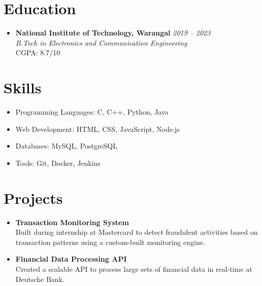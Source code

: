 \documentclass[a4paper,10pt]{article} %
\begin{document}
\vspace{0.7em} %

\section*{Education}
\begin{itemize}[leftmargin=0.3in, itemsep=3pt, topsep=2pt]
    \item
    \textbf{National Institute of Technology, Warangal} \hfill \textit{2019 – 2023} \\
    \textit{B.Tech in Electronics and Communication Engineering} \\
    CGPA: 8.7/10
\end{itemize}

\vspace{0.7em} %

\section*{Skills}
\begin{itemize}[leftmargin=0.3in, itemsep=3pt, topsep=2pt]
    \item Programming Languages: C, C++, Python, Java
    \item Web Development: HTML, CSS, JavaScript, Node.js
    \item Databases: MySQL, PostgreSQL
    \item Tools: Git, Docker, Jenkins
\end{itemize}

\vspace{0.7em} %

\section*{Projects}
\begin{itemize}[leftmargin=0.3in, itemsep=3pt, topsep=2pt]
    \item \textbf{Transaction Monitoring System} \\
    Built during internship at Mastercard to detect fraudulent activities based on transaction patterns using a custom-built monitoring engine.

    \item \textbf{Financial Data Processing API} \\
    Created a scalable API to process large sets of financial data in real-time at Deutsche Bank.
\end{itemize}
\end{document}
